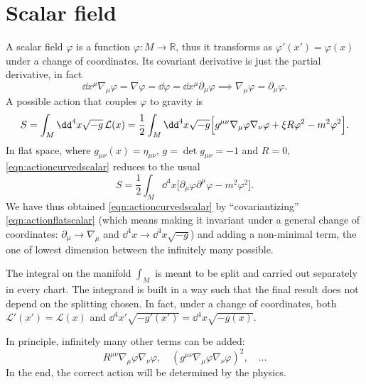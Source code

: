 \documentclass[a4paper,12pt]{book}
\begin{document}
\section{Scalar field}
A scalar field $\varphi$ is a function $\varphi\colon M\to\mathbb R$, thus it transforms as $\varphi'(x')=\varphi(x)$ under a change of coordinates. Its covariant derivative is just the partial derivative, in fact
\[\dd x^\mu\nabla_\mu\varphi=\nabla\varphi=\dd\varphi=\dd x^\mu\partial_\mu\varphi\implies\nabla_\mu\varphi=\partial_\mu\varphi.\]
A possible action that couples $\varphi$ to gravity is
\begin{equation}
S=\int_M\dd^4x\sqrt{-g}\,\mathcal L(x)=\frac{1}{2}\int_M\dd^4x\sqrt{-g}\Bigl[g^{\mu\nu}\nabla_\mu\varphi\nabla_\nu\varphi+\xi R\varphi^2-m^2\varphi^2\Bigr].
\label{eqn:actioncurvedscalar}
\end{equation}
In flat space, where $g_{\mu\nu}(x)=\eta_{\mu\nu}$, $g=\det g_{\mu\nu}=-1$ and $R=0$, \cref{eqn:actioncurvedscalar} reduces to the usual
\begin{equation}
S=\frac{1}{2}\int_M\dd^4x\Bigr[\partial_\mu\varphi\partial^\mu\varphi-m^2\varphi^2\Bigr].
\label{eqn:actionflatscalar}
\end{equation}
We have thus obtained \cref{eqn:actioncurvedscalar} by ``covariantizing'' \cref{eqn:actionflatscalar} (which means making it invariant under a general change of coordinates: $\partial_\mu\to\nabla_\mu$ and $\dd^4x\to\dd^4x\sqrt{-g}$) and adding a non-minimal term, the one of lowest dimension between the infinitely many possible.

The integral on the manifold $\int_M$ is meant to be split and carried out separately in every chart. The integrand is built in a way such that the final result does not depend on the splitting chosen. In fact, under a change of coordinates, both $\mathcal L'(x')=\mathcal L(x)$ and $\dd^4x'\sqrt{-g'(x')}=\dd^4x\sqrt{-g(x)}$.

In principle, infinitely many other terms can be added:
\[R^{\mu\nu}\nabla_\mu\varphi\nabla_\nu\varphi,\quad (g^{\mu\nu}\nabla_\mu\varphi\nabla_\nu\varphi)^2,\quad\ldots\]
In the end, the correct action will be determined by the physics.
\end{document}
